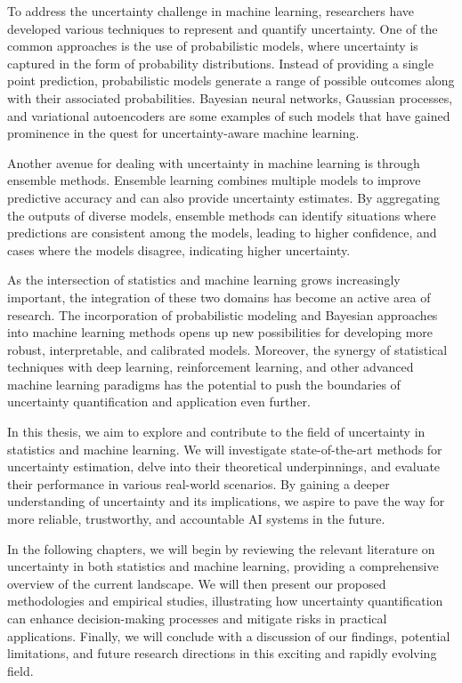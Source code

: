 To address the uncertainty challenge in machine learning, researchers have developed various techniques to represent and quantify uncertainty. One of the common approaches is the use of probabilistic models, where uncertainty is captured in the form of probability distributions. Instead of providing a single point prediction, probabilistic models generate a range of possible outcomes along with their associated probabilities. Bayesian neural networks, Gaussian processes, and variational autoencoders are some examples of such models that have gained prominence in the quest for uncertainty-aware machine learning.

Another avenue for dealing with uncertainty in machine learning is through ensemble methods. Ensemble learning combines multiple models to improve predictive accuracy and can also provide uncertainty estimates. By aggregating the outputs of diverse models, ensemble methods can identify situations where predictions are consistent among the models, leading to higher confidence, and cases where the models disagree, indicating higher uncertainty.

As the intersection of statistics and machine learning grows increasingly important, the integration of these two domains has become an active area of research. The incorporation of probabilistic modeling and Bayesian approaches into machine learning methods opens up new possibilities for developing more robust, interpretable, and calibrated models. Moreover, the synergy of statistical techniques with deep learning, reinforcement learning, and other advanced machine learning paradigms has the potential to push the boundaries of uncertainty quantification and application even further.

In this thesis, we aim to explore and contribute to the field of uncertainty in statistics and machine learning. We will investigate state-of-the-art methods for uncertainty estimation, delve into their theoretical underpinnings, and evaluate their performance in various real-world scenarios. By gaining a deeper understanding of uncertainty and its implications, we aspire to pave the way for more reliable, trustworthy, and accountable AI systems in the future.

In the following chapters, we will begin by reviewing the relevant literature on uncertainty in both statistics and machine learning, providing a comprehensive overview of the current landscape. We will then present our proposed methodologies and empirical studies, illustrating how uncertainty quantification can enhance decision-making processes and mitigate risks in practical applications. Finally, we will conclude with a discussion of our findings, potential limitations, and future research directions in this exciting and rapidly evolving field.

\fi
\fi